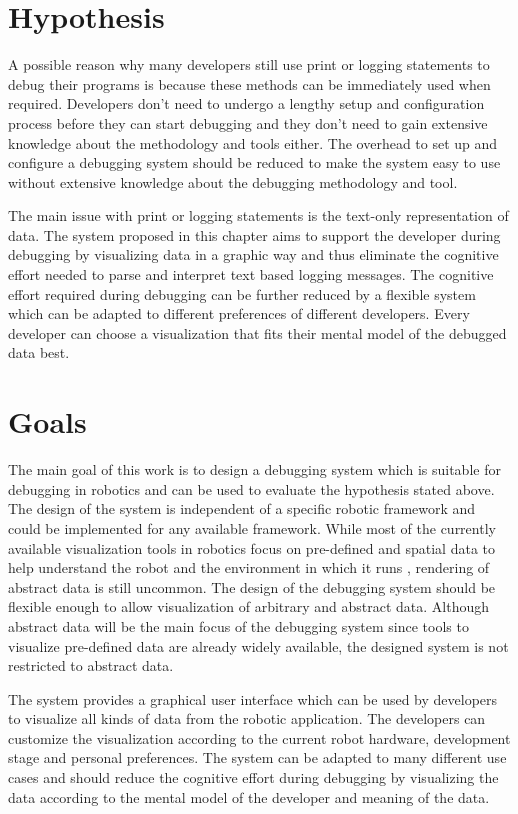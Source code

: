 \section{Hypothesis}
A possible reason why many developers still use print or logging statements to debug their programs is because these methods can be immediately used when required. Developers don't need to undergo a lengthy setup and configuration process before they can start debugging and they don't need to gain extensive knowledge about the methodology and tools either. The overhead to set up and configure a debugging system should be reduced to make the system easy to use without extensive knowledge about the debugging methodology and tool.

The main issue with print or logging statements is the text-only representation of data. The system proposed in this chapter aims to support the developer during debugging by visualizing data in a graphic way and thus eliminate the cognitive effort needed to parse and interpret text based logging messages. The cognitive effort required during debugging can be further reduced by a flexible system which can be adapted to different preferences of different developers. Every developer can choose a visualization that fits their mental model of the debugged data best.


\section{Goals}
The main goal of this work is to design a debugging system which is suitable for debugging in robotics and can be used to evaluate the hypothesis stated above. The design of the system is independent of a specific robotic framework and could be implemented for any available framework.
While most of the currently available visualization tools in robotics focus on pre-defined and spatial data to help understand the robot and the environment in which it runs \cite{Collett2010, Quigley2009}, rendering of abstract data is still uncommon. The design of the debugging system should be flexible enough to allow visualization of arbitrary and abstract data. Although abstract data will be the main focus of the debugging system since tools to visualize pre-defined data are already widely available, the designed system is not restricted to abstract data.

The system provides a graphical user interface which can be used by developers to visualize all kinds of data from the robotic application. The developers can customize the visualization according to the current robot hardware, development stage and personal preferences. The system can be adapted to many different use cases and should reduce the cognitive effort during debugging by visualizing the data according to the mental model of the developer and meaning of the data.

